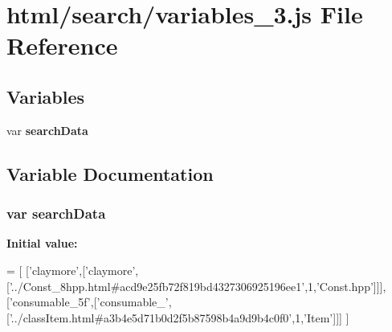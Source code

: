 \section{html/search/variables\-\_\-3.js File Reference}
\label{variables__3_8js}
\subsection*{Variables}
\begin{DoxyCompactItemize}
\item 
var {\bf search\-Data}
\end{DoxyCompactItemize}


\subsection{Variable Documentation}
\subsubsection[{search\-Data}]{\setlength{\rightskip}{0pt plus 5cm}var search\-Data}\label{variables__3_8js_ad01a7523f103d6242ef9b0451861231e}
{\bfseries Initial value\-:}
\begin{DoxyCode}
=
[
  [\textcolor{stringliteral}{'claymore'},[\textcolor{stringliteral}{'claymore'},[\textcolor{stringliteral}{'../Const\_8hpp.html#acd9e25fb72f819bd4327306925196ee1'},1,\textcolor{stringliteral}{'Const.hpp'}]]],
  [\textcolor{stringliteral}{'consumable\_5f'},[\textcolor{stringliteral}{'consumable\_'},[\textcolor{stringliteral}{'../classItem.html#a3b4e5d71b0d2f5b87598b4a9d9b4c0f0'},1,\textcolor{stringliteral}{'Item'}]]]
]
\end{DoxyCode}
